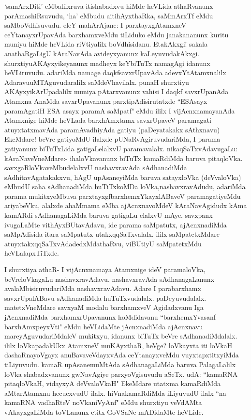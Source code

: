 \begin{artha}
`samArxDiti' eMbalilxruva itishabadxvu hiMde heVLida athaRvanunx parAmashiRsuvudu, `ha' eMbudu aitihAyxthaRka, saMmArxTf eMdu saMboVdhisuvudu. eleY mahArAjane: I parxtayxgAtamxneV ceYtanayxrUpavAda barxhamxveMdu tiLiduko eMdu janakananunx kuritu muniyu hiMde heVLida riVtiyalilx boVdhisidanu. EtakAkxgi! sakala anathaRgaLigU kAraNavAda avideyxyanunx kaLeyuvudakAkxgi. shurxtiyu\break AKAyxyikeyanunx madheyx keYbiTuTx namagAgi idanunx heVLiruvudu. adariMda namage daqkfsavxrUpavAda adevxYtAtamxnalilx Adaravu\break uMTAguvudaralilx saMdeVhavilalx. punaH shurxtiyu AKAyxyikA\break rUpadalilx muniya pAtarxvanunx vahisi I daqkf savxrUpanAda Atamxna AnaMda savxrUpavanunx parxtipAdisirutatxde ``ESAsayx paramAgatiH ESA asayx paramA saMpatf" eMdu ililx I vijAcnxnamayanAda Atamxnige hiMde heVLada barxhAmxtamx savxrUpaveV paramagati atuyxtatxmavAda paramAvadhiyAda gatiyu (paDeyatakakx sAthxnavu) EkeMdare! beVre gatiyoMdU ilalxde pUNaRvAgiruvudariMda, I parama gatiyanunx biTuTxLida gatigaLelalxvU paramavalalx. nikaqSaTxvAdavugaLu: kAraNaveVneMdare:- ihaloVkavanunx biTuTx kamaRdiMda baruva pitaqloVka. savxgaRloVkaveMbudelalxvU nashavxravAda sAdhanadiMda sAdhitavAgatakakxvu, hAgU upAsaneyiMda baruva satayxloVka (deVvaloVka) eMbudU saha sAdhanadiMda huTiTxkoMDa loVka,\break nashavxravAdudu, adariMda parama mukitxyeMbuva parxtayxgfbarxhemxYkayx\-lABaveV paramagatiyeMdu ariyabeVku, alalxde ahaMmama eMba ajAcnxnavoMdeV kAraNavAgidudx kAma kamARdi sAdhanagaLiMda baruva gatigaLu elalxvU mAye. savxpanx ivugaLaMte vithAyxBUtavAdavu, ide parama saMpatutx, ajAcnxnadiMda saMpAdisida itara saMpatutx utakxqqSaTxvalalx. ililx saMpatetxMdare atuyxtakxqqSaTxvAdadedxMdathaRvu, viBUtiyU saMpatetxMdu heVLalapxTiTxde. 
\end{artha}%

\begin{artha}
I shurxtiya athaR- I vijAcnxnamaya Atamxnige ideV paramaloVka, beVreloVkagaLu nashavxravAdavu, nashavxravAda sAdhanagaLanunx avalaMbisiruvudariMda nashavxravAdavu. Adare I parabarxhamx savxrUpalABavu sAdhanadiMda huTuTxvudalalx. paDeyuvudalalx. matetxVneMdare savxyaM modalu barxhamxveV Agidadxvanu Iga jAcnxnadiMda barxhamxrUpavanunx hoMdidavanu ``barxhemxYvasanf barxhAmxpeyxVti" eMdu heVLidaMte jAcnxnadiMda ajAcnxnavu mareyAguvudariMdaleV mukitxyu, idanunx biTuTx beVre sAdhanadiMdalalx. ililx loVkapadakUkx AtamxneV muKAyxthaR, heVge? loVkayxta iti loVkaH dashaRnayoVgayx anuBavaveVdayxvAda ceYtanayxveMdu vuyxtapxtitxyiMda tiLiyuvudu. kamaR upAsane\break muMtAda sAdhanagaLiMda baruva PalagaLalilx loVka shabadxvanunx gwNavAgiye parxyoVgisuvudu aSeTx. udA: ``kamaRNA pitaqloVkaH, vidayxyA deVvaloVkaH" EkeMdare utatxma kamaRdiMda aMtarAtamxnu hecucxvudU ilalx. hiVnakamaRdiMda iLiyuvudU ilalx ``na kamaRNA vadhaRteV noVkaniVyAnf" eMdu shurxtiyu veVdAMta vAkayxgaLiMda toVLanunx etitx GoVSaNe mADidaMte heVLide. 
\end{artha}%

